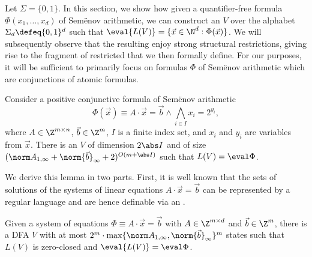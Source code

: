 
Let $\Sigma=\{0,1\}$. In this section, we show how given a
quantifier-free formula $\Phi(x_1,\ldots,x_d)$ of Sem{\"e}nov
arithmetic, we can construct an \laVASS $V$ over the alphabet
$\Sigma_d\defeq \{0,1\}^d$ such that $\eval{L(V)}= \{\vec
x\in\N^d:\Phi(\vec x)\}$. We will subsequently observe that the
resulting \laVASS enjoy strong structural restrictions, giving rise to
the fragment of restricted \laVASS that we then formally define. For
our purposes, it will be sufficient to primarily focus on formulas
$\Phi$ of Sem{\"e}nov arithmetic which are conjunctions of atomic
formulas.
%
\begin{lemma}\label{lem:conjunctive-lavass}
  Consider a positive conjunctive formula of Sem{\"e}nov arithmetic
  \[
  \Phi(\vec x) \equiv A\cdot \vec x = \vec b \wedge
  \bigwedge_{i\in I} x_i = 2^{y_i},
  \]
  where $A\in \Z^{m\times n}$, $\vec b\in \Z^m$, $I$ is
  a finite index set, and $x_i$ and $y_i$
  are variables from $\vec x$. There is an \laVASS $V$ of dimension
  $2 \abs I$ and of size $(\norm A_{1,\infty} + \norm{\vec b}_\infty +
  2)^{O(m+\abs I)}$ such that $L(V)=\eval \Phi$.
\end{lemma}
%

We derive this lemma in two parts. First, it is well known that the
sets of solutions of the systems of linear equations $A\cdot \vec x
= \vec b$ can be represented by a regular language and are hence definable via
an \laVASS.
\begin{lemma}\label{lem:equations-lavass}
  Given a system of equations $\Phi \equiv A\cdot \vec x = \vec b$
  with $A \in \Z^{m\times d}$ and $\vec b\in \Z^m$, there is a DFA $V$
  with at most $2^m \cdot \max\{ \norm A_{1,\infty}, \norm{\vec
  b}_\infty \}^m$ states such that $L(V)$ is zero-closed and
  $\eval{L(V)}=\eval \Phi$.
\end{lemma}
%

